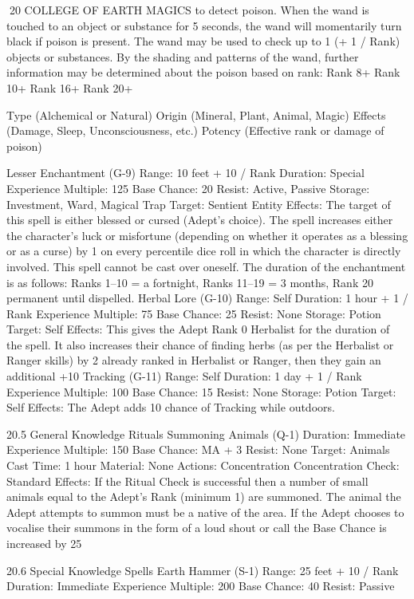\documentclass[a4paper]{article}
\begin{document}
\begin{multicols}{3}
20 COLLEGE OF EARTH MAGICS
to detect poison. When the wand is touched to an
object or substance for 5 seconds, the wand will
momentarily turn black if poison is present. The
wand may be used to check up to 1 (+ 1 / Rank)
objects or substances. By the shading and patterns
of the wand, further information may be determined about the poison based on rank:
Rank 8+
Rank
10+
Rank
16+
Rank
20+

Type (Alchemical or Natural)
Origin (Mineral, Plant, Animal, Magic)
Effects (Damage, Sleep, Unconsciousness, etc.)
Potency (Effective rank or damage of
poison)

Lesser Enchantment (G-9)
Range: 10 feet + 10 / Rank
Duration: Special
Experience Multiple: 125
Base Chance: 20%
Resist: Active, Passive
Storage: Investment, Ward, Magical Trap
Target: Sentient Entity
Effects: The target of this spell is either blessed or
cursed (Adept’s choice). The spell increases either
the character’s luck or misfortune (depending on
whether it operates as a blessing or as a curse) by 1
on every percentile dice roll in which the character
is directly involved. This spell cannot be cast over
oneself. The duration of the enchantment is as
follows: Ranks 1–10 = a fortnight, Ranks 11–19 =
3 months, Rank 20 permanent until dispelled.
Herbal Lore (G-10)
Range: Self
Duration: 1 hour + 1 / Rank
Experience Multiple: 75
Base Chance: 25%
Resist: None
Storage: Potion
Target: Self
Effects: This gives the Adept Rank 0 Herbalist for
the duration of the spell. It also increases their
chance of finding herbs (as per the Herbalist or
Ranger skills) by 2%
already ranked in Herbalist or Ranger, then they
gain an additional +10%
Tracking (G-11)
Range: Self
Duration: 1 day + 1 / Rank
Experience Multiple: 100
Base Chance: 15%
Resist: None
Storage: Potion
Target: Self
Effects: The Adept adds 10%
chance of Tracking while outdoors.

20.5 General Knowledge Rituals
Summoning Animals (Q-1)
Duration: Immediate
Experience Multiple: 150
Base Chance: MA + 3%
Resist: None
Target: Animals
Cast Time: 1 hour
Material: None
Actions: Concentration
Concentration Check: Standard
Effects: If the Ritual Check is successful then a
number of small animals equal to the Adept’s Rank
(minimum 1) are summoned. The animal the Adept
attempts to summon must be a native of the area. If
the Adept chooses to vocalise their summons in the
form of a loud shout or call the Base Chance is
increased by 25%

20.6 Special Knowledge Spells
Earth Hammer (S-1)
Range: 25 feet + 10 / Rank
Duration: Immediate
Experience Multiple: 200
Base Chance: 40%
Resist: Passive


\end{multicols}
\end{document}

